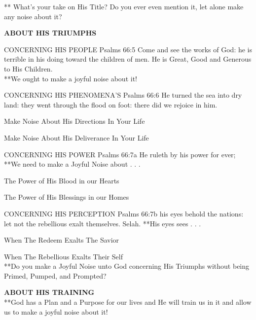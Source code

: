 \begin{compactenum}[I.][5]
\begin{compactenum}[A.]
\begin{compactenum}[1.]
** What's your take on His Title? Do you ever even mention it, let alone make any noise about it? 
            \end{compactenum}
    \end{compactenum}
    \item \textbf{ABOUT HIS TRIUMPHS}
    \begin{compactenum}[A.]
        \item CONCERNING HIS PEOPLE 
Psalms 66:5 Come and see the works of God: he is
terrible in his doing toward the children of men.
            He is Great, Good and Generous to His Children.\\
**We ought to make a joyful noise about it!
        \item CONCERNING HIS PHENOMENA'S
Psalms 66:6 He turned the sea into dry land: they
went through the flood on foot: there did we rejoice in him.
        \begin{compactenum}[1.]
            \item Make Noise About His Directions In Your Life
            \item Make Noise About His Deliverance In Your Life
        \end{compactenum}
        \item CONCERNING HIS POWER 
Psalms 66:7a  He ruleth by his power for ever;
**We need to make a Joyful Noise about . . .
        \begin{compactenum}[1.]
            \item The Power of His Blood in our Hearts
            \item The Power of His Blessings in our Homes
        \end{compactenum}
        \item CONCERNING HIS PERCEPTION 
Psalms 66:7b  his eyes behold the nations: let not
the rebellious exalt themselves. Selah.
**His eyes sees . . .
        \begin{compactenum}[1.]
            \item When The Redeem Exalts The Savior
            \item  When The Rebellious Exalts Their Self\\
            **Do you make a Joyful Noise unto God concerning His Triumphs without being Primed, Pumped, and Prompted?
        \end{compactenum}
    \end{compactenum}
    \item \textbf{ABOUT HIS TRAINING}
    \\ **God has a Plan and a Purpose for our lives and He will train us in it and allow us to make a joyful noise about it!

\end{compactenum}
